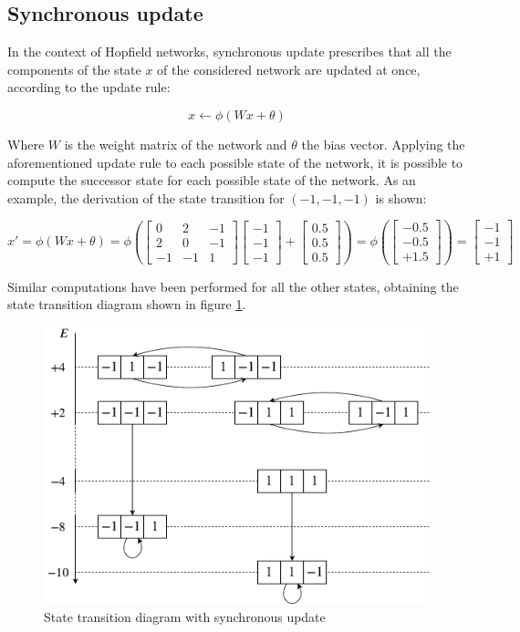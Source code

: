 \documentclass[letterpaper,headings=standardclasses]{scrartcl}
\begin{document}
\subsection{Synchronous update}

In the context of Hopfield networks, synchronous update prescribes that all the components of the state $x$ of the considered network are updated at once, according to the update rule:

$$ x \leftarrow \phi(Wx + \theta) $$

Where $W$ is the weight matrix of the network and $\theta$ the bias vector. Applying the aforementioned update rule to each possible state of the network, it is possible to compute the successor state for each possible state of the network. As an example, the derivation of the state transition for $(-1, -1, -1)$ is shown:

$$ x' = \phi(Wx + \theta) = \phi \left( \left[ \begin{matrix} 0 & 2 & -1 \\ 2 & 0 & -1 \\ -1 & -1 & 1 \end{matrix} \right] \left[ \begin{matrix} -1 \\ -1 \\ -1 \end{matrix} \right] + \left[ \begin{matrix} 0.5 \\ 0.5 \\ 0.5 \end{matrix} \right] \right) = \phi \left( \left[ \begin{matrix} -0.5 \\ -0.5 \\ +1.5 \end{matrix} \right] \right) = \left[ \begin{matrix} -1 \\ -1 \\ +1 \end{matrix} \right] $$

Similar computations have been performed for all the other states, obtaining the state transition diagram shown in figure \ref{sync}.

\begin{figure}[h]
    \centering
    \includegraphics[width=0.7\linewidth]{sync.pdf}
    \caption{State transition diagram with synchronous update}
    \label{sync}
\end{figure}
\end{document}
